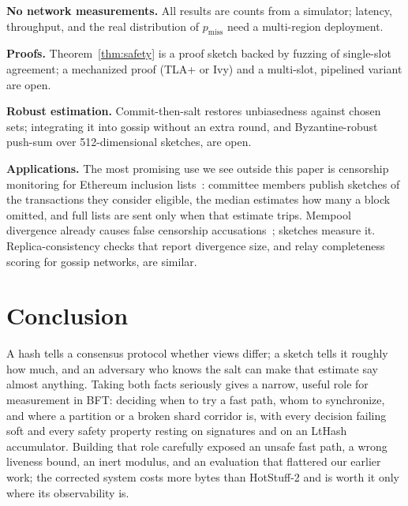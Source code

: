 \documentclass[journal]{IEEEtran}
\begin{document}
\textbf{No network measurements.} All results are counts from a
simulator; latency, throughput, and the real distribution of
$p_{\mathrm{miss}}$ need a multi-region deployment.

\textbf{Proofs.} Theorem~\ref{thm:safety} is a proof sketch backed by
fuzzing of single-slot agreement; a mechanized proof (TLA+ or Ivy) and a
multi-slot, pipelined variant are open.

\textbf{Robust estimation.} Commit-then-salt restores unbiasedness
against chosen sets; integrating it into gossip without an extra round,
and Byzantine-robust push-sum over 512-dimensional sketches, are open.

\textbf{Applications.} The most promising use we see outside this paper
is censorship monitoring for Ethereum inclusion lists~\cite{eip7805}:
committee members publish sketches of the transactions they consider
eligible, the median estimates how many a block omitted, and full lists
are sent only when that estimate trips. Mempool divergence already causes
false censorship accusations~\cite{albrecht2026mempool}; sketches
measure it. Replica-consistency checks that report divergence size, and
relay completeness scoring for gossip networks, are similar.

\section{Conclusion}
\label{sec:conclusion}

A hash tells a consensus protocol whether views differ; a sketch tells it
roughly how much, and an adversary who knows the salt can make that
estimate say almost anything. Taking both facts seriously gives a narrow,
useful role for measurement in BFT: deciding when to try a fast path,
whom to synchronize, and where a partition or a broken shard corridor
is, with every decision failing soft and every safety property resting
on signatures and on an LtHash accumulator. Building that role carefully
exposed an unsafe fast path, a wrong liveness bound, an inert modulus,
and an evaluation that flattered our earlier work; the corrected system
costs more bytes than HotStuff-2 and is worth it only where its
observability is.



\end{document}
